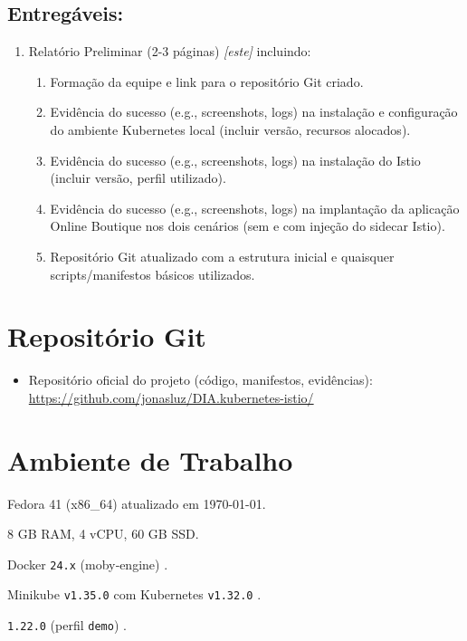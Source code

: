 \documentclass[9pt,a4paper,twocolumn,twoside]{tau-class/tau}
\begin{document}
\subsection{Entregáveis:}
\begin{enumerate}
    \item Relatório Preliminar (2-3 páginas) \textit{[este]} incluindo:
    \begin{enumerate}
        \item Formação da equipe e link para o repositório Git criado.
        \item Evidência do sucesso (e.g., screenshots, logs) na instalação e configuração do ambiente Kubernetes local (incluir versão, recursos alocados).
        \item Evidência do sucesso (e.g., screenshots, logs) na instalação do Istio (incluir versão, perfil utilizado).
        \item Evidência do sucesso (e.g., screenshots, logs) na implantação da aplicação Online Boutique nos dois cenários (sem e com injeção do sidecar Istio).
        \item Repositório Git atualizado com a estrutura inicial e quaisquer scripts/manifestos básicos utilizados.
    \end{enumerate}
\end{enumerate}


\section{Repositório Git}
\begin{itemize}[leftmargin=*]
  \item Repositório oficial do projeto (código, manifestos, evidências):\\
  \url{https://github.com/jonasluz/DIA.kubernetes-istio/}
\end{itemize}


\section{Ambiente de Trabalho}
\begin{description}[leftmargin=1.5cm]
  \item[Sistema] Fedora 41 (x86\_64) atualizado em \today.
  \item[Recursos] 8 GB RAM, 4 vCPU, 60 GB SSD.
  \item[Container Runtime] Docker \texttt{24.x} (moby‑engine) \cite{docker}.
  \item[Cluster] Minikube \texttt{v1.35.0} com Kubernetes \texttt{v1.32.0} \cite{minikube}.
  \item[Istio] \texttt{1.22.0} (perfil \texttt{demo}) \cite{istio}.
\end{description}
\end{document}
